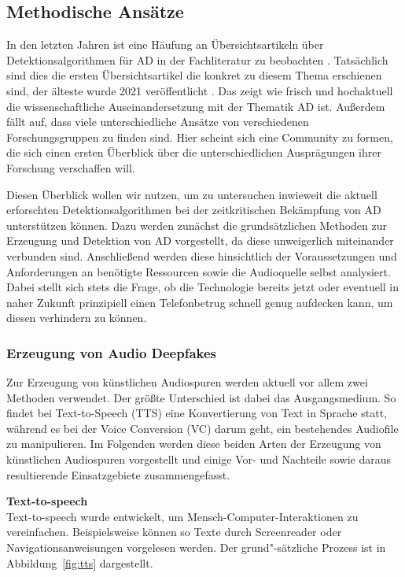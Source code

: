\subsection{Methodische Ansätze}
In den letzten Jahren ist eine Häufung an Übersichtsartikeln über Detektionsalgorithmen für AD in der Fachliteratur zu beobachten \citep[][]{Masood2022,Almutairi2022,Khanjani2021}.
Tatsächlich sind dies die ersten Übersichtsartikel die konkret zu diesem Thema erschienen sind, der älteste wurde 2021 veröffentlicht \citep[][]{Khanjani2021}.
Das zeigt wie frisch und hochaktuell die wissenschaftliche Auseinandersetzung mit der Thematik AD ist.
Außerdem fällt auf, dass viele unterschiedliche Ansätze von verschiedenen Forschungsgruppen zu finden sind.
Hier scheint sich eine Community zu formen, die sich einen ersten Überblick über die unterschiedlichen Ausprägungen ihrer Forschung verschaffen will.

Diesen Überblick wollen wir nutzen, um zu untersuchen inwieweit die aktuell erforschten Detektionsalgorithmen bei der zeitkritischen Bekämpfung von AD unterstützen können.
Dazu werden zunächst die grundsätzlichen Methoden zur Erzeugung und Detektion von AD vorgestellt, da diese unweigerlich miteinander verbunden sind.
Anschließend werden diese hinsichtlich der Voraussetzungen und Anforderungen an benötigte Ressourcen sowie die Audioquelle selbst analysiert.
Dabei stellt sich stets die Frage, ob die Technologie bereits jetzt oder eventuell in naher Zukunft prinzipiell einen Telefonbetrug schnell genug aufdecken kann, um diesen verhindern zu können.

\subsubsection{Erzeugung von Audio Deepfakes}
Zur Erzeugung von künstlichen Audiospuren werden aktuell vor allem zwei Methoden verwendet.
Der größte Unterschied ist dabei das Ausgangsmedium.
So findet bei Text-to-Speech (TTS) eine Konvertierung von Text in Sprache statt, während es bei der Voice Conversion (VC) darum geht, ein bestehendes Audiofile zu manipulieren.
Im Folgenden werden diese beiden Arten der Erzeugung von künstlichen Audiospuren vorgestellt und einige Vor- und Nachteile sowie daraus resultierende Einsatzgebiete zusammengefasst.
\clearpage

\textbf{Text-to-speech}\\
Text-to-speech wurde entwickelt, um Mensch-Computer-Interaktionen zu vereinfachen.
Beispielsweise können so Texte durch Screenreader oder Navigationsanweisungen vorgelesen werden.
Der grund"-sätzliche Prozess ist in Abbildung~\ref{fig:tts} \citep[][]{Masood2022} dargestellt.

